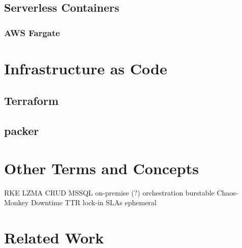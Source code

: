 \section{Serverless Containers}
\subsection{AWS Fargate}

\chapter{Infrastructure as Code}
\section{Terraform}
\section{packer}


\chapter{Other Terms and Concepts}
RKE
LZMA
CRUD
MSSQL
on-premise (?)
orchestration
burstable
Chaos-Monkey
Downtime
TTR
lock-in
SLAs
ephemeral

\chapter{Related Work}
